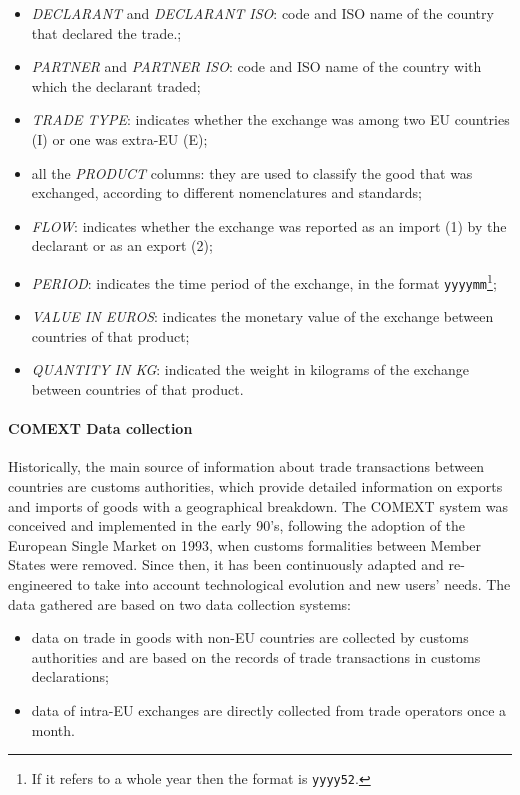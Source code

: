\begin{itemize}
    \item \textit{DECLARANT} and \textit{DECLARANT ISO}: code and ISO name of the country that declared the trade.;
    \item \textit{PARTNER} and \textit{PARTNER ISO}: code and ISO name of the country with which the declarant traded;
    \item \textit{TRADE TYPE}: indicates whether the exchange was among two EU countries (I) or one was extra-EU (E);
    \item all the \textit{PRODUCT} columns: they are used to classify the good that was exchanged, according to different nomenclatures and standards;
    \item \textit{FLOW}: indicates whether the exchange was reported as an import (1) by the declarant or as an export (2);
    \item \textit{PERIOD}: indicates the time period of the exchange, in the format \texttt{yyyymm}\footnote{If it refers to a whole year then the format is \texttt{yyyy52}.};
    \item \textit{VALUE IN EUROS}: indicates the monetary value of the exchange between countries of that product;
    \item \textit{QUANTITY IN KG}: indicated the weight in kilograms of the exchange between countries of that product.
\end{itemize}



\paragraph{COMEXT Data collection}
Historically, the main source of information about trade transactions between countries are customs authorities, which provide detailed information on exports and imports of goods with a geographical breakdown.
The COMEXT system was conceived and implemented in the early 90's,  following the adoption of the European Single Market on 1993, when customs formalities between Member States were removed. Since then, it has been continuously adapted and re-engineered to take into account technological evolution and new users' needs. The data gathered are based on two data collection systems:
\begin{itemize}
    \item data on trade in goods with non-EU countries are collected by customs authorities and are based on the records of trade transactions in customs declarations;
    \item data of intra-EU exchanges are directly collected from trade operators once a month.
\end{itemize}


